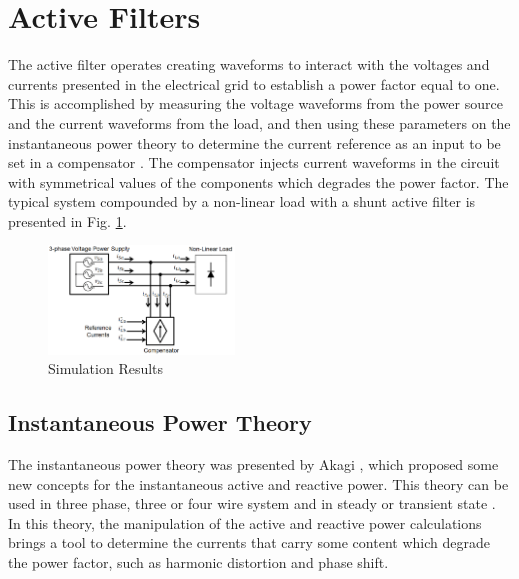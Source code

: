 \section{Active Filters}

The active filter operates creating waveforms to interact with the voltages and currents presented in the electrical grid to establish a power factor equal to one. This is accomplished by measuring the voltage waveforms from the power source and the current waveforms from the load, and then using these parameters on the instantaneous power theory to determine the current reference as an input to be set in a compensator \cite{Akagi2006}. The compensator injects current waveforms in the circuit with symmetrical values of the components which degrades the power factor. The typical system compounded by a non-linear load with a shunt active filter is presented in Fig. \ref{fig:compensador.png}.

\begin{figure}[!h]
\centering
\includegraphics[width=0.44\textwidth]{Figures/compensador.png}
\caption{Simulation Results}
\label{fig:compensador.png}
\end{figure}



\subsection{Instantaneous Power Theory}

The instantaneous power theory was presented by Akagi \cite{Akagi1984}, which proposed some new concepts for the instantaneous active and reactive power. This theory can be used in three phase, three or four wire system and in steady or transient state \cite{Akagi2007}. In this theory, the manipulation of the active and reactive power calculations brings a tool to determine the currents that carry some content which degrade the power factor, such as harmonic distortion and phase shift.

